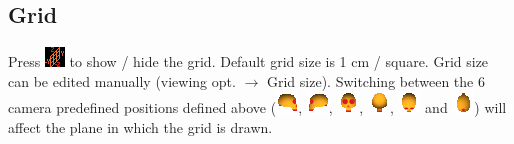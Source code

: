 \subsection{Grid}
Press \includegraphics[scale=0.7]{images/06/other/grid.png} to show / hide the grid. Default grid size is 1 cm / square. Grid size can be edited manually
(viewing opt. $\rightarrow$ Grid size).
Switching between the 6 camera predefined positions defined above (\includegraphics[scale=0.7]{images/06/camera/camera_right.png}, 
\includegraphics[scale=0.7]{images/06/camera/camera_left.png}, 
\includegraphics[scale=0.7]{images/06/camera/camera_front.png}, 
\includegraphics[scale=0.7]{images/06/camera/camera_back.png}, 
\includegraphics[scale=0.7]{images/06/camera/camera_above.png} and 
\includegraphics[scale=0.7]{images/06/camera/camera_below.png})
will affect the plane in which the grid is drawn.




